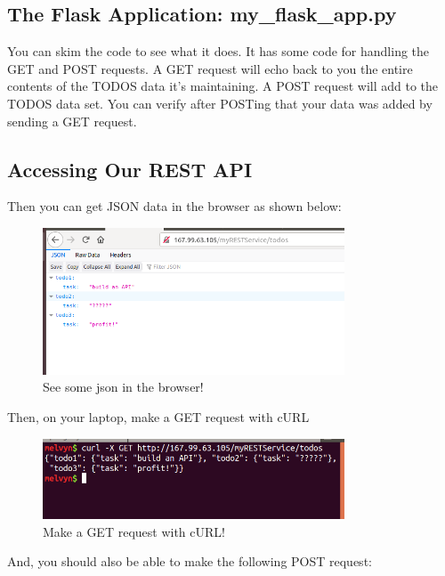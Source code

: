 \documentclass[10pt]{article}
\begin{document}
\subsection{The Flask Application: my\_flask\_app.py}
You can skim the code to see what it does. It has some code for handling the GET and POST requests. A GET request will echo back to you the entire contents of the TODOS data it's maintaining. A POST request will add to the TODOS data set. You can verify after POSTing that your data was added by sending a GET request.



\subsection{Accessing Our REST API}
Then you can get JSON data in the browser as shown below:

\begin{figure}[h]
  \centering
    \includegraphics[width=0.8\textwidth]{restInBrowser.png}
  \caption{See some json in the browser!}
\end{figure}

Then, on your laptop, make a GET request with cURL


\begin{figure}[h]
  \centering
    \includegraphics[width=0.8\textwidth]{curlYourAPI.png}
  \caption{Make a GET request with cURL!}
\end{figure}

And, you should also be able to make the following POST request:


\end{document}
